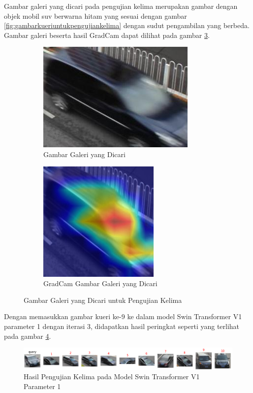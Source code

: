 Gambar galeri yang dicari pada pengujian kelima merupakan gambar dengan objek \linebreak mobil suv berwarna hitam 
yang sesuai dengan gambar \ref{fig:gambarkueriuntukpengujiankelima} dengan sudut pengambilan yang berbeda. 
Gambar galeri beserta hasil GradCam dapat dilihat pada gambar \ref{fig:gambargaleriuntukpengujiankelima}.

\begin{figure}[h!]
  \centering
  \begin{subfigure}{.5\textwidth}
    \centering
    \includegraphics[width=.4\linewidth]{gambar/Gal9_1019.jpg}
    \caption{Gambar Galeri yang Dicari}
    \label{gambargalerinomorsembilan}
  \end{subfigure}%
  \begin{subfigure}{.5\textwidth}
    \centering
    \includegraphics[width=.4\linewidth]{gambar/GradCamGal9_1019.jpg}
    \caption{GradCam Gambar Galeri yang Dicari}
    \label{gradcamgambargalerinomorsembilan}
  \end{subfigure}
  \caption{Gambar Galeri yang Dicari untuk Pengujian Kelima}
  \label{fig:gambargaleriuntukpengujiankelima}
\end{figure}

Dengan memasukkan gambar kueri ke-9 ke dalam model Swin Transformer V1 parameter 1 dengan iterasi 3, didapatkan hasil 
peringkat seperti yang terlihat pada gambar \ref{fig:hasilpengujiankelimapadamodelswintransformerv1param1}.

\begin{figure}[h!]
  \centering
  \includegraphics[scale=0.6]{gambar/Que9V1P1IT3.png}
  \caption{Hasil Pengujian Kelima pada Model Swin Transformer V1 Parameter 1}
  \label{fig:hasilpengujiankelimapadamodelswintransformerv1param1}
\end{figure}

